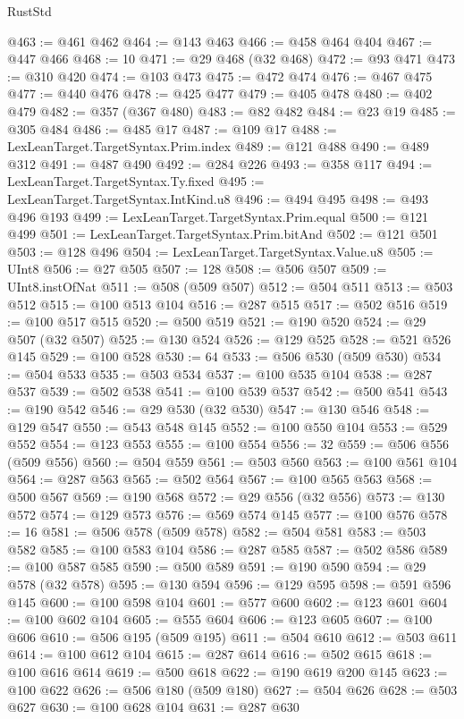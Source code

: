 \begin{lexlean}{RustStd}
\begin{coremodule}
@463 := @461 @462
@464 := @143 @463
@466 := @458 @464 @404
@467 := @447 @466
@468 := 10
@471 := @29 @468 (@32 @468)
@472 := @93 @471
@473 := @310 @420
@474 := @103 @473
@475 := @472 @474
@476 := @467 @475
@477 := @440 @476
@478 := @425 @477
@479 := @405 @478
@480 := @402 @479
@482 := @357 (@367 @480)
@483 := @82 @482
@484 := @23 @19
@485 := @305 @484
@486 := @485 @17
@487 := @109 @17
@488 := LexLeanTarget.TargetSyntax.Prim.index
@489 := @121 @488
@490 := @489 @312
@491 := @487 @490
@492 := @284 @226
@493 := @358 @117
@494 := LexLeanTarget.TargetSyntax.Ty.fixed
@495 := LexLeanTarget.TargetSyntax.IntKind.u8
@496 := @494 @495
@498 := @493 @496 @193
@499 := LexLeanTarget.TargetSyntax.Prim.equal
@500 := @121 @499
@501 := LexLeanTarget.TargetSyntax.Prim.bitAnd
@502 := @121 @501
@503 := @128 @496
@504 := LexLeanTarget.TargetSyntax.Value.u8
@505 := UInt8
@506 := @27 @505
@507 := 128
@508 := @506 @507
@509 := UInt8.instOfNat
@511 := @508 (@509 @507)
@512 := @504 @511
@513 := @503 @512
@515 := @100 @513 @104
@516 := @287 @515
@517 := @502 @516
@519 := @100 @517 @515
@520 := @500 @519
@521 := @190 @520
@524 := @29 @507 (@32 @507)
@525 := @130 @524
@526 := @129 @525
@528 := @521 @526 @145
@529 := @100 @528
@530 := 64
@533 := @506 @530 (@509 @530)
@534 := @504 @533
@535 := @503 @534
@537 := @100 @535 @104
@538 := @287 @537
@539 := @502 @538
@541 := @100 @539 @537
@542 := @500 @541
@543 := @190 @542
@546 := @29 @530 (@32 @530)
@547 := @130 @546
@548 := @129 @547
@550 := @543 @548 @145
@552 := @100 @550 @104
@553 := @529 @552
@554 := @123 @553
@555 := @100 @554
@556 := 32
@559 := @506 @556 (@509 @556)
@560 := @504 @559
@561 := @503 @560
@563 := @100 @561 @104
@564 := @287 @563
@565 := @502 @564
@567 := @100 @565 @563
@568 := @500 @567
@569 := @190 @568
@572 := @29 @556 (@32 @556)
@573 := @130 @572
@574 := @129 @573
@576 := @569 @574 @145
@577 := @100 @576
@578 := 16
@581 := @506 @578 (@509 @578)
@582 := @504 @581
@583 := @503 @582
@585 := @100 @583 @104
@586 := @287 @585
@587 := @502 @586
@589 := @100 @587 @585
@590 := @500 @589
@591 := @190 @590
@594 := @29 @578 (@32 @578)
@595 := @130 @594
@596 := @129 @595
@598 := @591 @596 @145
@600 := @100 @598 @104
@601 := @577 @600
@602 := @123 @601
@604 := @100 @602 @104
@605 := @555 @604
@606 := @123 @605
@607 := @100 @606
@610 := @506 @195 (@509 @195)
@611 := @504 @610
@612 := @503 @611
@614 := @100 @612 @104
@615 := @287 @614
@616 := @502 @615
@618 := @100 @616 @614
@619 := @500 @618
@622 := @190 @619 @200 @145
@623 := @100 @622
@626 := @506 @180 (@509 @180)
@627 := @504 @626
@628 := @503 @627
@630 := @100 @628 @104
@631 := @287 @630

\end{coremodule}
\end{lexlean}
